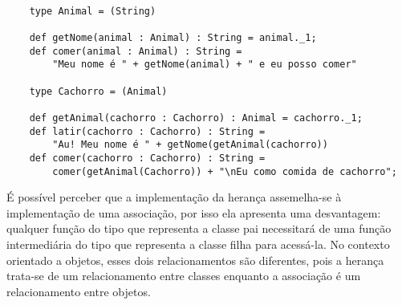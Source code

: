 \begin{lstlisting}[caption={Herança em Programação Funcional.},label=fpinheritance]
    
    type Animal = (String)

    def getNome(animal : Animal) : String = animal._1;
    def comer(animal : Animal) : String = 
        "Meu nome é " + getNome(animal) + " e eu posso comer"

    type Cachorro = (Animal)

    def getAnimal(cachorro : Cachorro) : Animal = cachorro._1;
    def latir(cachorro : Cachorro) : String = 
        "Au! Meu nome é " + getNome(getAnimal(cachorro))
    def comer(cachorro : Cachorro) : String = 
        comer(getAnimal(Cachorro)) + "\nEu como comida de cachorro";

\end{lstlisting}

É possível perceber que a implementação da herança 
assemelha-se à implementação de uma associação, 
por isso ela apresenta uma desvantagem: 
qualquer função do tipo que representa 
a classe pai necessitará de uma função 
intermediária do tipo que representa a classe 
filha para acessá-la. 
No contexto orientado a objetos, esses dois 
relacionamentos são diferentes, pois a 
herança trata-se de um relacionamento entre 
classes enquanto a associação é um relacionamento 
entre objetos\cite{umlsystems}. 